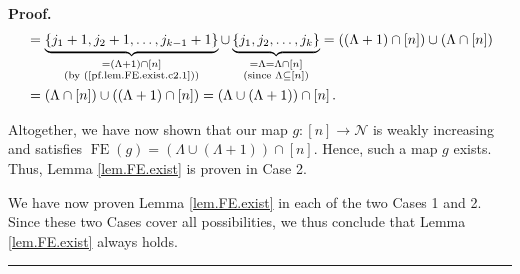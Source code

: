 \documentclass[numbers=enddot,12pt,final,onecolumn,notitlepage]{scrartcl}%
\theoremstyle{definition}
\newenvironment{proof}[1][Proof]{\noindent\textbf{#1.} }{\ \rule{0.5em}{0.5em}}
\newenvironment{verlong}{}{}
\begin{document}
\begin{verlong}
\begin{proof}
\begin{align*}
&  =\underbrace{\left\{  j_{1}+1,j_{2}+1,\ldots,j_{k-1}+1\right\}
}_{\substack{=\left(  \Lambda+1\right)  \cap\left[  n\right]  \\\text{(by
(\ref{pf.lem.FE.exist.c2.1}))}}}\cup\underbrace{\left\{  j_{1},j_{2}%
,\ldots,j_{k}\right\}  }_{\substack{=\Lambda=\Lambda\cap\left[  n\right]
\\\text{(since }\Lambda\subseteq\left[  n\right]  \text{)}}}=\left(  \left(
\Lambda+1\right)  \cap\left[  n\right]  \right)  \cup\left(  \Lambda
\cap\left[  n\right]  \right) \\
&  =\left(  \Lambda\cap\left[  n\right]  \right)  \cup\left(  \left(
\Lambda+1\right)  \cap\left[  n\right]  \right)  =\left(  \Lambda\cup\left(
\Lambda+1\right)  \right)  \cap\left[  n\right]  .
\end{align*}


Altogether, we have now shown that our map $g:\left[  n\right]  \rightarrow
\mathcal{N}$ is weakly increasing and satisfies $\operatorname*{FE}\left(
g\right)  =\left(  \Lambda\cup\left(  \Lambda+1\right)  \right)  \cap\left[
n\right]  $. Hence, such a map $g$ exists. Thus, Lemma \ref{lem.FE.exist} is
proven in Case 2.

We have now proven Lemma \ref{lem.FE.exist} in each of the two Cases 1 and 2.
Since these two Cases cover all possibilities, we thus conclude that Lemma
\ref{lem.FE.exist} always holds.
\end{proof}
\end{verlong}
\end{document}
